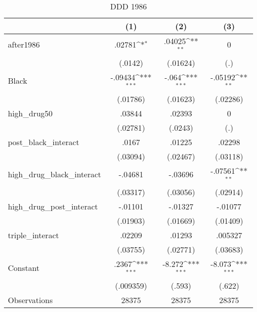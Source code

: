 \begin{table}[htbp]\centering
\def\sym#1{\ifmmode^{#1}\else\(^{#1}\)\fi}
\caption{DDD 1986}
\begin{tabular}{l*{3}{c}}
\hline\hline
                    &\multicolumn{1}{c}{(1)}         &\multicolumn{1}{c}{(2)}         &\multicolumn{1}{c}{(3)}         \\
\hline
after1986           &      .02781\sym{*}  &      .04025\sym{**} &           0         \\
                    &     (.0142)         &    (.01624)         &         (.)         \\
[1em]
Black               &     -.09434\sym{***}&       -.064\sym{***}&     -.05192\sym{**} \\
                    &    (.01786)         &    (.01623)         &    (.02286)         \\
[1em]
high\_drug50         &      .03844         &      .02393         &           0         \\
                    &    (.02781)         &     (.0243)         &         (.)         \\
[1em]
post\_black\_interact &       .0167         &      .01225         &      .02298         \\
                    &    (.03094)         &    (.02467)         &    (.03118)         \\
[1em]
high\_drug\_black\_interact&     -.04681         &     -.03696         &     -.07561\sym{**} \\
                    &    (.03317)         &    (.03056)         &    (.02914)         \\
[1em]
high\_drug\_post\_interact&     -.01101         &     -.01327         &     -.01077         \\
                    &    (.01903)         &    (.01669)         &    (.01409)         \\
[1em]
triple\_interact     &      .02209         &      .01293         &     .005327         \\
                    &    (.03755)         &    (.02771)         &    (.03683)         \\
[1em]
Constant            &       .2367\sym{***}&      -8.272\sym{***}&      -8.073\sym{***}\\
                    &   (.009359)         &      (.593)         &      (.622)         \\
\hline
Observations        &       28375         &       28375         &       28375         \\

\end{tabular}
\end{table}
